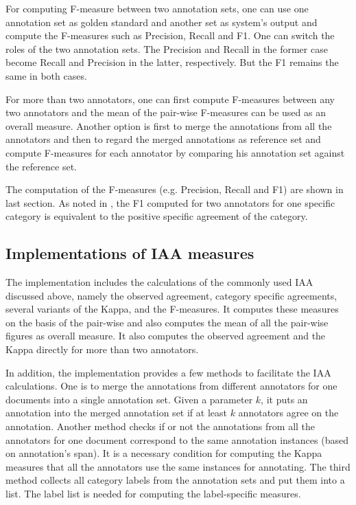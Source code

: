 For computing F-measure between two annotation sets, one can use one annotation 
set as golden standard and another set as system's output and compute the 
F-measures such as Precision, Recall and F1. One can switch the roles of the 
two annotation sets. The Precision and 
Recall in the former case become Recall and Precision in the latter, respectively. But 
the F1 remains the same in both cases.

For more than two annotators, one can first compute F-measures between any two annotators and 
the mean of the pair-wise F-measures can be used as an overall measure. 
Another option is first to merge the annotations from all the annotators and then to
 regard the merged annotations as reference set and compute F-measures for each 
annotator by comparing his annotation set against the reference set.

The computation of the F-measures (e.g. Precision, Recall and F1) are shown in 
last section.
As noted in \cite{Hripcsak05}, the F1 computed for two annotators for one specific 
category is equivalent to the positive specific agreement of the category.

\subsection{Implementations of IAA measures}

The implementation includes the calculations of the commonly used IAA discussed above, 
namely the observed agreement, category specific agreements, several variants of 
the Kappa, and the F-measures. 
It computes these measures on the basis of the pair-wise and also computes
the mean of all the pair-wise figures as overall measure. It also computes
the observed agreement and the Kappa directly for more than two annotators.

In addition, the implementation provides a few methods to facilitate the IAA calculations.
One is to merge the annotations from different annotators for one documents into a single
annotation set. Given a parameter $k$, it puts an annotation into the merged annotation set
if at least $k$ annotators agree on the annotation. Another method checks if or not the 
annotations from all the annotators for one document correspond to the same 
annotation instances (based on annotation's span). It is a necessary condition for 
computing the Kappa measures that all the annotators use the same instances for 
annotating. The third method collects all category labels from the annotation sets and
put them into a list. The label list is needed for computing the label-specific 
measures.

